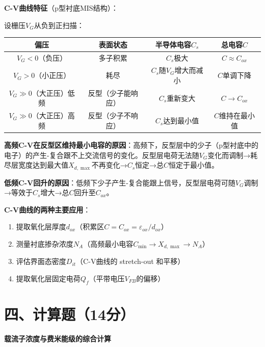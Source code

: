 \documentclass[12pt,a4paper]{ctexart}
\begin{document}
\textbf{C-V曲线特征}（p型衬底MIS结构）：

设栅压$V_G$从负到正扫描：

\begin{center}
\begin{tabular}{c|c|c|c}
\toprule
\textbf{偏压} & \textbf{表面状态} & \textbf{半导体电容$C_s$} & \textbf{总电容$C$} \\
\midrule
$V_G < 0$（负压） & 多子积累 & $C_s$极大 & $C \approx C_{ox}$ \\
$V_G > 0$（小正压） & 耗尽 & $C_s$随$V_G$增大而减小 & $C$单调下降 \\
$V_G \gg 0$（大正压）低频 & 反型（少子能响应） & $C_s$重新变大 & $C \to C_{ox}$ \\
$V_G \gg 0$（大正压）高频 & 反型（少子不响应） & $C_s$达到最小值 & $C$维持在最小值 \\
\bottomrule
\end{tabular}
\end{center}

\textbf{高频C-V在反型区维持最小电容的原因}：高频下，反型层中的少子（p型衬底中的电子）的产生-复合跟不上交流信号的变化。反型层电荷无法随$V_G$变化而调制→耗尽层宽度达到最大值$X_{d,\max}$不再变化→$C_s$恒定→总$C$恒定于最小值。

\textbf{低频C-V回升的原因}：低频下少子产生-复合能跟上信号，反型层电荷可随$V_G$调制→等效于$C_s$增大→总$C$回升至$C_{ox}$。

\textbf{C-V曲线的两种主要应用}：
\begin{enumerate}[nosep]
\item 提取氧化层厚度$d_{ox}$（积累区$C = C_{ox} = \varepsilon_{ox}/d_{ox}$）
\item 测量衬底掺杂浓度$N_A$（高频最小电容$C_{\min} \to X_{d,\max} \to N_A$）
\item 评估界面态密度$D_{it}$（C-V曲线的 stretch-out 和平移）
\item 提取氧化层固定电荷$Q_f$（平带电压$V_{FB}$的偏移）
\end{enumerate}

\newpage

\section*{四、计算题（14分）}

\noindent\textbf{载流子浓度与费米能级的综合计算}

\vspace{4pt}
\end{document}
